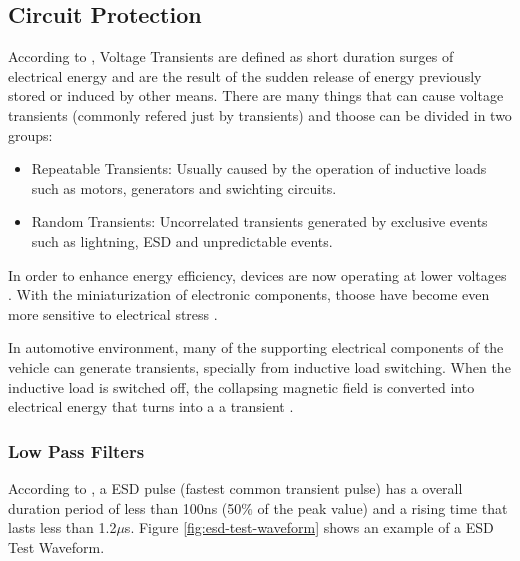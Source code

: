 \subsection{Circuit Protection}\label{ssec:circuitProtection}

According to \cite{littlelFuseWhatIsTransientVoltage}, Voltage Transients are defined as short duration surges of electrical energy and are the result of the sudden release of energy previously stored or induced by other means. There are many things that can cause voltage transients (commonly refered just by transients) and thoose can be divided in two groups:

\begin{itemize}
	\item Repeatable Transients: Usually caused by the operation of inductive loads such as motors, generators and swichting circuits.\label{itm:repeatable-transients}
	\item Random Transients: Uncorrelated transients generated by exclusive events such as lightning, ESD and unpredictable events.\label{itm:random-transients}
\end{itemize}

In order to enhance energy efficiency, devices are now operating at lower voltages \cite{xavier2017benefits}. With the miniaturization of electronic components, thoose have become even more sensitive to electrical stress \cite{littlelFuseWhatIsTransientVoltage}.
\par
In automotive environment, many of the supporting electrical components of the vehicle can generate transients, specially from inductive load switching. When the inductive load is switched off, the collapsing magnetic field is converted into electrical energy that turns into a a transient \cite{littlelFuseWhatIsTransientVoltage}.

\subsubsection{Low Pass Filters}\label{sssec:lowPassFilterTransientProtection}
	According to \cite{littlelFuseWhatIsTransientVoltage}, a ESD pulse (fastest common transient pulse) has a overall duration period of less than 100ns (50$\%$ of the peak value) and a rising time that lasts less than 1.2$\mu$s. Figure \ref{fig:esd-test-waveform} shows an example of a ESD Test Waveform.

